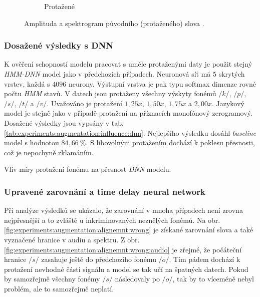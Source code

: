 \begin{figure}[htpb]
\begin{subfigure}[b]{0.42\textwidth}
    \caption{Protažené}
    \label{fig:experiments:augmentation:compare:augmented}
  \end{subfigure}
  \caption{Amplituda a spektrogram původního (protaženého) slova .}
  \label{fig:experiments:augmentation:compare}
\end{figure}

\subsubsection{Dosažené výsledky s DNN}

K ověření schopností modelu pracovat s uměle protaženými daty je použit stejný \textit{HMM-DNN} model jako v předchozích případech. Neuronová síť má $5$ skrytých vrstev, každá s $4096$ neurony. Výstupní vrstva je pak typu softmax dimenze rovné počtu \textit{HMM} stavů. V datech jsou protaženy všechny výskyty fonémů $/k/$, $/p/$, $/s/$, $/t/$ a $/v/$. Uvažováno je protažení $1,25x$, $1,50x$, $1,75x$ a $2,00x$. Jazykový model je stejně jako v případě protažení na příznacích monofónový zerogramový. Dosažené výsledky jsou vypsány v tab. \ref{tab:experiments:augmentation:influence:dnn}. Nejlepšího výsledku dosáhl \textit{baseline} model s hodnotou $84,66\ \%$. S libovolným protažením dochází k poklesu přesnosti, což je nepochyně zklamáním.

\begin{table}[htpb]
  \centering
  \def\arraystretch{1.5}
  \caption{Vliv míry protažení fonému na přesnost \textit{DNN} modelu.}
  \label{tab:experiments:augmentation:influence:dnn}
\end{table}

\subsubsection{Upravené zarovnání a time delay neural network}

Při analýze výsledků se ukázalo, že zarovnání v mnoha případech není zrovna nejpřesnější a to zvláště u inkriminovaných neznělých fonémů. Na obr. \ref{fig:experiments:augmentation:alignemnt:wrong} je získané zarovnání slova  a také vyznačené hranice v audiu a spektru. Z obr. \ref{fig:experiments:augmentation:alignemnt:wrong:audio} je zřejmé, že počáteční hranice $/s/$ zasahuje ještě do předchozího fonému $/o/$. Tím pádem dochází k protažení nevhodné části signálu a model se tak učí na špatných datech. Pokud by samozřejmě všechny fonémy $/s/$ následovaly po $/o/$, tak by to víceméně nebyl problém, ale to samozřejmě neplatí.

